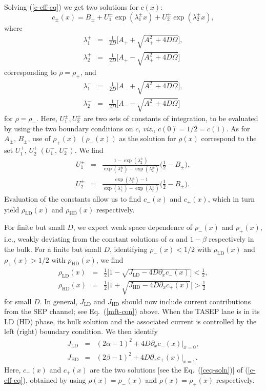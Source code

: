 \documentclass[aps,pre,twocolumn,superscriptaddress,amsmath,amssymb,longbibliography,floatfix,nofootinbib]{revtex4}
\begin{document}
{Solving (\ref{c-eff-eq}) we get two solutions for $c(x)$:
\begin{equation}
 c_\pm(x)=B_\pm + U^\pm_1\exp(\lambda^\pm_1 x)+U^\pm_2\exp(\lambda^\pm_2 x),\label{ceq-soln}
\end{equation}
where
\begin{eqnarray}
 \lambda_1^+&=&\frac{1}{2D}\bigg[A_++\sqrt{A_+^2+4D\Omega}\bigg],\\
 \lambda_2^+&=&\frac{1}{2D}\bigg[A_+-\sqrt{A_+^2+4D\Omega}\bigg]
\end{eqnarray}
corresponding to $\rho=\rho_+$, and
\begin{eqnarray}
 \lambda_1^-&=&\frac{1}{2D}\bigg[A_-+\sqrt{A_-^2+4D\Omega}\bigg],\\
 \lambda_2^-&=&\frac{1}{2D}\bigg[A_--\sqrt{A_-^2+4D\Omega}\bigg]
\end{eqnarray}
for $\rho=\rho_-$.
Here, $U^\pm_1,U^\pm_2$ are two sets of constants of integration, to be evaluated by using the two boundary conditions on $c$, {\em viz.}, $c(0)=1/2=c(1)$. As for $A_\pm,\,B_\pm$, use of $\rho_+(x)\; (\rho_-(x))$ as the solution for $\rho(x)$ correspond to the set $U^+_1,\,U^+_2\,(U^-_1,\,U^-_2)$. We find
\begin{eqnarray}
 U_1^\pm&=& \frac{1-\exp(\lambda_2^\pm)}{\exp(\lambda_1^\pm)-\exp(\lambda_2^\pm)}\bigg(\frac{1}{2}-B_\pm\bigg),\\
 U_2^\pm&=& \frac{\exp(\lambda_1^\pm)-1}{\exp(\lambda_1^\pm)-\exp(\lambda_2^\pm)}\bigg(\frac{1}{2}-B_\pm\bigg).
\end{eqnarray}
Evaluation of the constants allow us to find $c_-(x)$ and $c_+(x)$, which in turn yield $\rho_\text{LD}(x)$ and $\rho_\text{HD}(x)$ respectively.  


For finite but small $D$, we expect weak space dependence of $\rho_-(x)$ and $\rho_+(x)$, i.e., weakly deviating from the constant solutions of $\alpha$ and $1-\beta$ respectively in the bulk. For a finite but small $D$, identifying $\rho_-(x)<1/2$ with $\rho_\text{LD}(x)$ and $\rho_+(x)>1/2$ with $\rho_\text{HD}(x)$, we find 
\begin{eqnarray}
 \rho_\text{LD}(x)&=&\frac{1}{2}\bigg[1-\sqrt{J_\text{LD}-4D\partial_x c_-(x)}\bigg]<\frac{1}{2},\label{rho-ld-smallD}\\
 \rho_\text{HD}(x)&=&\frac{1}{2}\bigg[1+\sqrt{J_\text{HD}-4D\partial_x c_+(x)}\bigg]>\frac{1}{2} \label{rho-hd-smallD}
\end{eqnarray}
for small $D$.
In general, $J_\text{LD}$ and $J_\text{HD}$ should now include current contributions from the SEP channel; see Eq.~(\ref{mft-con}) above. When the TASEP lane is in its LD (HD) phase, its bulk solution and the associated current is controlled by the left (right) boundary condition. We then identify 
\begin{eqnarray}
 J_\text{LD}&=& (2\alpha-1)^2+ 4D\partial_x c_-(x)|_{x=0},\\
 J_\text{HD}&=&(2\beta-1)^2 + 4D\partial_x c_+(x)|_{x=1}.
\end{eqnarray}
Here, $c_-(x)$ and $c_+(x)$ are the two solutions [see the Eq.~(\ref{ceq-soln})] of  (\ref{c-eff-eq}), obtained by using $\rho(x)=\rho_-(x)$ and $\rho(x)=\rho_+(x)$ respectively.


}
\end{document}
